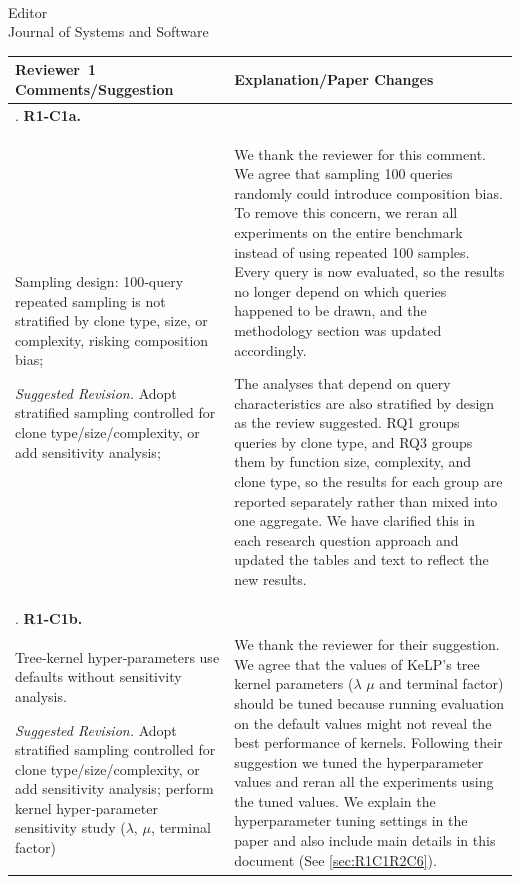 \documentclass[
pagenumber=false, %
parskip=half, %
fromalign=right, %
foldmarks=false, %
addrfield=false %
]{scrlttr2}
\newcounter{commentcounter} %
\newcommand{\comment}[1]{\refstepcounter{commentcounter}\thecommentcounter.} %
\begin{document}
\begin{letter}{\\Editor\\Journal of Systems and Software}
		
	\begin{longtable}{p{}p{}}
		
		\toprule
		\textbf{Reviewer~1 Comments/Suggestion} & \textbf{Explanation/Paper Changes} \\ \midrule
		\endhead
		
		 	\comment{1} \textbf{R1-C1a.}\\ Sampling design: 100‑query repeated sampling is not stratified by clone type, size, or complexity, risking composition bias; \newline 
		 	
		 	\textit{Suggested Revision.} Adopt stratified sampling controlled for clone type/size/complexity, or add sensitivity analysis; &  		 	
		 
		 	We thank the reviewer for this comment. We agree that sampling 100 queries randomly could introduce composition bias. To remove this concern, we reran all experiments on the entire benchmark instead of using repeated 100 samples. Every query is now evaluated, so the results no longer depend on which queries happened to be drawn, and the methodology section was updated accordingly.
		 	
		 	The analyses that depend on query characteristics are also stratified by design as the review suggested. RQ1 groups queries by clone type, and RQ3 groups them by function size, complexity, and clone type, so the results for each group are reported separately rather than mixed into one aggregate. We have clarified this in each research question approach and updated the tables and text to reflect the new results.
		 	 \\ \midrule 
		 	
		 	\comment{1} \textbf{R1-C1b.}\\ Tree‑kernel hyper‑parameters use defaults without sensitivity analysis.  \newline
		 	
		 	\textit{Suggested Revision.} Adopt stratified sampling controlled for clone type/size/complexity, or add sensitivity analysis; perform kernel hyper‑parameter sensitivity study ($\lambda$, $\mu$, terminal factor) & We thank the reviewer for their suggestion. We agree that the values of KeLP's tree kernel parameters ($\lambda$ $\mu$ and terminal factor) should be tuned because running evaluation on the default values might not reveal the best performance of kernels. Following their suggestion we tuned the hyperparameter values and reran all the experiments using the tuned values. We explain the hyperparameter tuning settings in the paper and also include main details in this document (See \ref{sec:R1C1R2C6}). 
		 	\\ \midrule
		 	

\end{longtable}
\end{letter}
\end{document}
